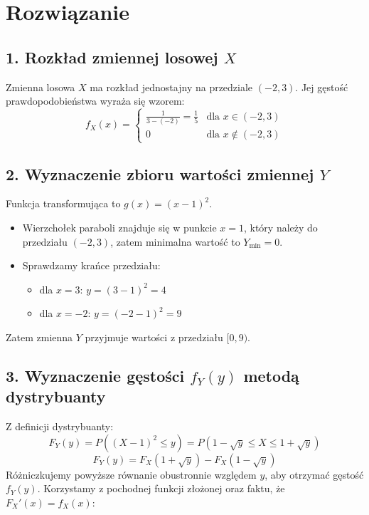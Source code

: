 \documentclass[polish, 10pt]{extarticle}
\begin{document}
\section*{Rozwiązanie}

\subsection*{1. Rozkład zmiennej losowej \(X\)}
Zmienna losowa \(X\) ma rozkład jednostajny na przedziale \((-2, 3)\). Jej gęstość prawdopodobieństwa wyraża się wzorem:
\begin{equation}
    f_X(x) = \begin{cases} 
        \frac{1}{3 - (-2)} = \frac{1}{5} & \text{dla } x \in (-2, 3) \\
        0 & \text{dla } x \notin (-2, 3)
    \end{cases}
\end{equation}

\subsection*{2. Wyznaczenie zbioru wartości zmiennej \(Y\)}
Funkcja transformująca to \(g(x) = (x-1)^2\).
\begin{itemize}
    \item Wierzchołek paraboli znajduje się w punkcie \(x=1\), który należy do przedziału \((-2, 3)\), zatem minimalna wartość to \(Y_{\min} = 0\).
    \item Sprawdzamy krańce przedziału:
    \begin{itemize}
        \item dla \(x = 3\): \(y = (3-1)^2 = 4\)
        \item dla \(x = -2\): \(y = (-2-1)^2 = 9\)
    \end{itemize}
\end{itemize}
Zatem zmienna \(Y\) przyjmuje wartości z przedziału \([0, 9)\).

\subsection*{3. Wyznaczenie gęstości \(f_Y(y)\) metodą dystrybuanty}
Z definicji dystrybuanty:
\[ F_Y(y) = P((X-1)^2 \le y) = P(1-\sqrt{y} \le X \le 1+\sqrt{y}) \]
\[ F_Y(y) = F_X(1+\sqrt{y}) - F_X(1-\sqrt{y}) \]
Różniczkujemy powyższe równanie obustronnie względem \(y\), aby otrzymać gęstość \(f_Y(y)\). Korzystamy z pochodnej funkcji złożonej oraz faktu, że \(F_X'(x) = f_X(x)\):
\end{document}
